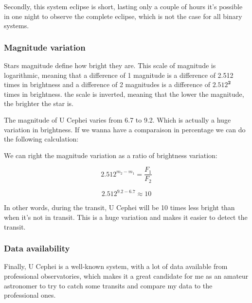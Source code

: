 \documentclass[12pt,a4paper]{article}
\begin{document}
Secondly, this system eclipse is short, lasting only a couple of hours it's possible in one night to observe the complete eclipse, which is not the case for all binary systems.

\subsubsection{Magnitude variation}

Stars magnitude define how bright they are. This scale of magnitude is logarithmic, meaning that a difference of 1 magnitude is a difference of 2.512 times in brightness and a difference of 2 magnitudes is a difference of \(\mathbf{2.512^2}\) times in brightness.
the scale is inverted, meaning that the lower the magnitude, the brighter the star is.

The magnitude of U Cephei varies from 6.7 to 9.2. Which is actually a huge variation in brightness. If we wanna have a comparaison in percentage we can do the following calculation:

We can right the magnitude variation as a ratio of brightness variation:

\begin{equation}
     2.512^{m_2-m_1} = \frac{F_1}{F_2}
\end{equation}

\begin{equation}
    2.512^{9.2-6.7} \approx 10
\end{equation}

In other words, during the transit, U Cephei will be 10 times less bright than when it's not in transit. This is a huge variation and makes it easier to detect the transit.

\subsubsection{Data availability}

Finally, U Cephei is a well-known system, with a lot of data available from professional observatories, which makes it a great candidate for me as an amateur astronomer to try to catch some transits and compare my data to the professional ones.

\end{document}
